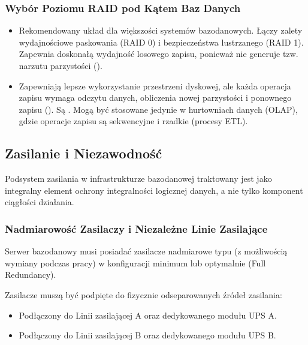 \documentclass[a4paper,11pt,english,openany,oneside]{sphinxmanual}
\begin{document}
\subsubsection{Wybór Poziomu RAID pod Kątem Baz Danych}
\label{\detokenize{rozdzial_2/rozdzial_21/index:wybor-poziomu-raid-pod-katem-baz-danych}}\begin{itemize}
\item {} 
\sphinxAtStartPar
{} Rekomendowany układ dla większości systemów bazodanowych. Łączy zalety wydajnościowe paskowania (RAID 0) i bezpieczeństwa lustrzanego (RAID 1). Zapewnia doskonałą wydajność losowego zapisu, ponieważ nie generuje tzw. narzutu parzystości ().

\item {} 
\sphinxAtStartPar
{} Zapewniają lepsze wykorzystanie przestrzeni dyskowej, ale każda operacja zapisu wymaga odczytu danych, obliczenia nowej parzystości i ponownego zapisu (). Są . Mogą być stosowane jedynie w hurtowniach danych (OLAP), gdzie operacje zapisu są sekwencyjne i rzadkie (procesy ETL).

\end{itemize}


\subsection{Zasilanie i Niezawodność}
\label{\detokenize{rozdzial_2/rozdzial_21/index:zasilanie-i-niezawodnosc}}
\sphinxAtStartPar
Podsystem zasilania w infrastrukturze bazodanowej traktowany jest jako integralny element ochrony integralności logicznej danych, a nie tylko komponent ciągłości działania.


\subsubsection{Nadmiarowość Zasilaczy i Niezależne Linie Zasilające}
\label{\detokenize{rozdzial_2/rozdzial_21/index:nadmiarowosc-zasilaczy-i-niezalezne-linie-zasilajace}}
\sphinxAtStartPar
Serwer bazodanowy musi posiadać zasilacze nadmiarowe typu  (z możliwością wymiany podczas pracy) w konfiguracji minimum  lub optymalnie  (Full Redundancy).

\sphinxAtStartPar
Zasilacze muszą być podpięte do fizycznie odseparowanych źródeł zasilania:
\begin{itemize}
\item {} 
\sphinxAtStartPar
{} Podłączony do Linii zasilającej A oraz dedykowanego modułu UPS A.

\item {} 
\sphinxAtStartPar
{} Podłączony do Linii zasilającej B oraz dedykowanego modułu UPS B.

\end{itemize}
\end{document}
